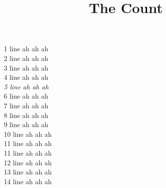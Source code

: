 \documentclass{ximera}
\title{The Count}
\begin{document}
1 line ah ah ah \\
2 line ah ah ah \\
3 line ah ah ah \\
4 line ah ah ah \\
\emph{5 line ah ah ah} \\
\normalsize{6 line ah ah ah} \\
\large{7 line ah ah ah} \\
\normalsize{8 line ah ah ah} \\
\tiny{9 line ah ah ah} \\
\normalsize{10 line ah ah ah} \\
\footnotesize{11 line ah ah ah} \\
\normalsize{11 line ah ah ah} \\
\huge{12 line ah ah ah} \\
\normalsize{13 line ah ah ah \\
14 line ah ah ah} \\
\end{document}
